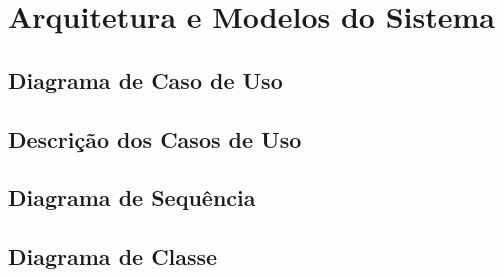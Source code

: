 \chapter{Arquitetura e Modelos do Sistema}


\section{Diagrama de Caso de Uso}


\section{Descriç\~ao dos Casos de Uso}


\section{Diagrama de Sequ\^encia}


\section{Diagrama de Classe}